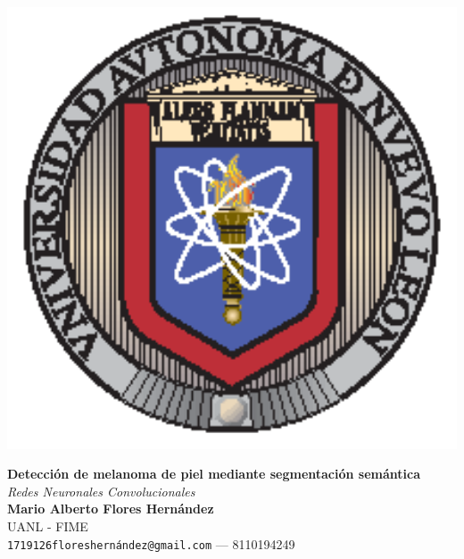\documentclass[a0,portrait]{a0poster}
\begin{document}
\begin{minipage}[b]{0.20\linewidth}
    \begin{center}
        \includegraphics[width=15cm]{uanl.eps}\\
        \vspace{5cm}
    \end{center}
\end{minipage}
%
\begin{minipage}[b]{0.60\linewidth}
    \begin{center}
        \veryHuge \color{Black} \textbf{Detección de melanoma de piel mediante segmentación semántica} \color{Black} \\[0.5cm]
        \Huge \textit{Redes Neuronales Convolucionales}\\[2cm]
        \huge \textbf{Mario Alberto Flores Hernández}\\[0.5cm]
        \huge UANL - FIME \\[0.4cm]
        \Large \texttt{1719126floreshernández@gmail.com} --- 8110194249
    \end{center}
\end{minipage}
%
\end{document}
